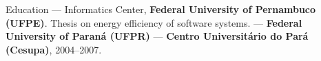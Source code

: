 \begin{rubric}{Education}
\entry*[2011--2015]
   --- Informatics Center, \textbf{Federal University of
  Pernambuco (UFPE)}. Thesis on energy efficiency of software systems.
\entry*[2008--2010]
   --- \textbf{Federal University of Paraná (UFPR)}
  \textbullet{}  --- \textbf{Centro Universitário do Pará (Cesupa)}, 2004--2007.
\end{rubric}
